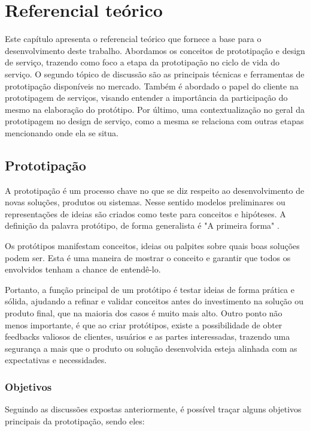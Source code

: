 \chapter[Referencial teórico]{Referencial teórico}

Este capítulo apresenta o referencial teórico que fornece a base para o desenvolvimento deste trabalho. Abordamos os conceitos de prototipação e design de serviço, trazendo como foco a etapa da prototipação no ciclo de vida do serviço. O segundo tópico de discussão são as principais técnicas e ferramentas de prototipação disponíveis no mercado. Também é abordado o papel do cliente na prototipagem de serviços, visando entender a importância da participação do mesmo na elaboração do protótipo. Por último, uma contextualização no geral da prototipagem no design de serviço, como a mesma se relaciona com outras etapas mencionando onde ela se situa.  

\section{Prototipação}

A prototipação é um processo chave no que se diz respeito ao desenvolvimento de novas soluções, produtos ou sistemas. Nesse sentido modelos preliminares ou representações de ideias são criados como teste para conceitos e hipóteses. A definição da palavra protótipo, de forma generalista é "A primeira forma" \cite{Blomkvist2011existing}.

Os protótipos manifestam conceitos, ideias ou palpites sobre quais boas soluções podem ser. Esta é uma maneira de mostrar o conceito e garantir que todos os envolvidos tenham a chance de entendê-lo. \cite{Blomkvist2014}

Portanto, a função principal de um protótipo é testar ideias de forma prática e sólida, ajudando a refinar e validar conceitos antes do investimento na solução ou produto final, que na maioria dos casos é muito mais alto. Outro ponto não menos importante, é que ao criar protótipos, existe a possibilidade de obter feedbacks valiosos de clientes, usuários e as partes interessadas, trazendo uma segurança a mais que o produto ou solução desenvolvida esteja alinhada com as expectativas e necessidades.

\subsection{Objetivos}

Seguindo as discussões expostas anteriormente, é possível traçar alguns objetivos principais da prototipação, sendo eles:

